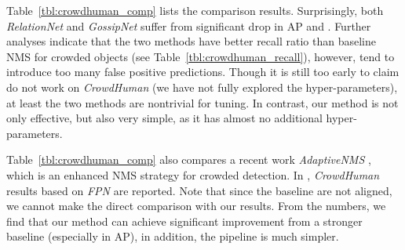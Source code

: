 \documentclass[10pt,twocolumn,letterpaper]{article}
\begin{document}
Table~\ref{tbl:crowdhuman_comp} lists the comparison results. Surprisingly, both \emph{RelationNet} and \emph{GossipNet} suffer from significant drop in AP and . Further analyses indicate that the two methods have better recall ratio than baseline NMS for crowded objects (see Table~\ref{tbl:crowdhuman_recall}), however, tend to introduce too many false positive predictions. Though it is still too early to claim \cite{hu2017relation,learningnms} do not work on \emph{CrowdHuman} (we have not fully explored the hyper-parameters), at least the two methods are nontrivial for tuning. In contrast, our method is not only effective, but also very simple, as it has almost no additional hyper-parameters. 

Table~\ref{tbl:crowdhuman_comp} also compares a recent work \emph{AdaptiveNMS} \cite{adaptiveNMS}, which is an enhanced NMS strategy for crowded detection. In \cite{adaptiveNMS}, \emph{CrowdHuman} results based on \emph{FPN} are reported. Note that since the baseline are not aligned, we cannot make the direct comparison with our results. From the numbers, we find that our method can achieve significant improvement from a stronger baseline (especially in AP), in addition, the pipeline is much simpler. 
\end{document}
